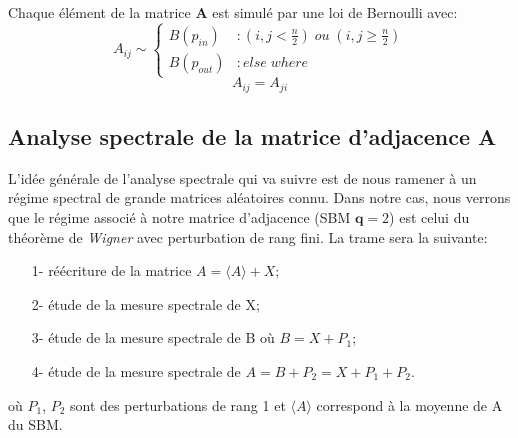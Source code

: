 Chaque élément de la matrice \textbf{A} est simulé par une loi de Bernoulli avec: 
\begin{equation}\label{rq:probability}
 A_{ij} \sim \left\{
  \begin{array}{lr}
    B(p_{in}) & : (i,j < \frac{n}{2}) \; ou \; (i,j \ge \frac{n}{2}) \\
    B(p_{out}) & : else \; where
  \end{array}
\right.\nonumber
\end{equation}
\begin{equation} 
A_{ij} = A_{ji}\nonumber
\end{equation}


\subsection{Analyse spectrale de la matrice d'adjacence \textbf{A}}\label{ch:Analyse spectrale de la matrice d'adjacence}
L'idée générale de l'analyse spectrale qui va suivre est de nous ramener à un régime spectral de grande matrices aléatoires connu. 
Dans notre cas, nous verrons que le régime associé à notre matrice d'adjacence (SBM $\textbf{q}=2$) est celui du théorème de \textit{Wigner} avec perturbation de rang fini.
La trame sera la suivante:
\begin{itemize}
 	\item[1-] réécriture de la matrice $A = \langle A \rangle + X$;
 	\item[2-] étude de la mesure spectrale de X;
 	\item[3-] étude de la mesure spectrale de B où $B = X + P_1$;
 	\item[4-] étude de la mesure spectrale de $A = B + P_2 = X + P_1 + P_2$.
 \end{itemize} 
où $P_1$, $P_2$ sont des perturbations de rang 1 et $\langle A \rangle$ correspond à la moyenne de A du SBM.\\
